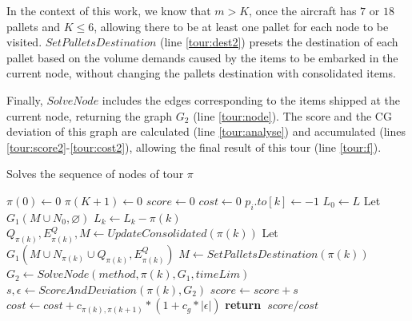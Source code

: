 \documentclass[preprint,authoryear]{elsarticle}
\renewcommand{\Return}{\State \bf {return}~}
\begin{document}
In the context of this work, we know that $m>K$, once the aircraft has $7$\/ or $18$\/ pallets and $K\leq 6$, allowing there to be at least one pallet for each node to be visited. $SetPalletsDestination$\/ (line \ref{tour:dest2}) presets the destination of each pallet based on the volume demands caused by the items to be embarked in the current node, without changing the pallets destination with consolidated items.

Finally, $SolveNode$\/ includes the edges corresponding to the items shipped at the current node, returning the graph $G_2$\/ (line \ref{tour:node}). The score and the CG deviation of this graph are calculated (line \ref{tour:analyse}) and accumulated (lines \ref{tour:score2}-\ref{tour:cost2}), allowing the final result of this tour (line \ref{tour:f}).

\begin{algorithm}[H]
	\caption{ Solves the sequence of nodes of tour $\pi$ }  \label{alg:tour}
	
	\begin{algorithmic}[1]
		
		
		\State $\pi(0) \gets 0$ \label{tour:pi1}
		\State $\pi(K+1) \gets 0$ \label{tour:pi2}
		\State $score \gets 0$ \label{tour:score}
		\State $cost \gets 0$ \label{tour:cost}
		 \label{tour:loop1}		
				\State $p_i.to[k] \gets -1$ \label{tour:-1} 
			\EndFor	
				\State $L_0 \gets L$
				\State Let $G_1(M \cup N_0, \varnothing)$ \label{tour:g11}
			\Else
				\State $L_k \gets L_k - \pi(k)$  \label{tour:lk1}			
				\State $Q_{\pi(k)}, E^Q_{\pi(k)}, M \gets UpdateConsolidated(\pi(k))$ \label{tour:dest}			
				\State Let $G_1(M \cup N_{\pi(k)} \cup Q_{\pi(k)}, E^Q_{\pi(k)})$ \label{tour:g12}
			\EndIf  \label{tour:lk2}	
			\State $M \gets SetPalletsDestination( \pi(k) )$ \label{tour:dest2}		
			\State $G_2 \gets SolveNode(method, \pi(k), G_1, timeLim)$ \label{tour:node}
			\State $s, \epsilon \gets ScoreAndDeviation(\pi(k), G_2)$ \label{tour:analyse}
			\State $score \gets score + s$ \label{tour:score2}
			\State $cost \gets cost + c_{\pi(k),\pi(k+1)} * (1 + c_g * |\epsilon|)$ \label{tour:cost2} 
		\EndFor  \label{tour:loop2}
		\Return $score / cost$ \label{tour:f}
		
		\EndProcedure
		
	\end{algorithmic}
\end{algorithm}
\end{document}
